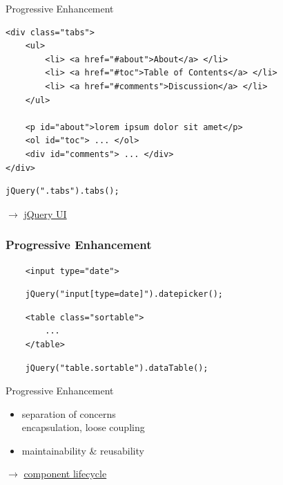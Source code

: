 \documentclass{beamer}
\begin{document}
\begin{frame}[fragile]{Progressive Enhancement}

  \begin{verbatim}
<div class="tabs">
    <ul>
        <li> <a href="#about">About</a> </li>
        <li> <a href="#toc">Table of Contents</a> </li>
        <li> <a href="#comments">Discussion</a> </li>
    </ul>

    <p id="about">lorem ipsum dolor sit amet</p>
    <ol id="toc"> ... </ol>
    <div id="comments"> ... </div>
</div>
  \end{verbatim}
  \begin{verbatim}
jQuery(".tabs").tabs();
  \end{verbatim}

  \tiny \ensuremath{\rightarrow} \href{http://jqueryui.com/tabs/}{jQuery UI}
\end{frame}

\begin{frame}[fragile]
  \frametitle{Progressive Enhancement}

  \begin{verbatim}
    <input type="date">
  \end{verbatim}
  \begin{verbatim}
    jQuery("input[type=date]").datepicker();
  \end{verbatim}

  \vspace*{0.5cm}
  \begin{verbatim}
    <table class="sortable">
        ...
    </table>
  \end{verbatim}
  \begin{verbatim}
    jQuery("table.sortable").dataTable();
  \end{verbatim}
\end{frame}

\begin{frame}{Progressive Enhancement}
  \begin{itemize}
    \item separation of concerns \\ encapsulation, loose coupling
    \item maintainability \& reusability
  \end{itemize}

  \vspace*{0.5cm}
  \ensuremath{\rightarrow}
  \href{http://helloworld.innoq.com/workshops/javascript/part4.html\#slide-40}{component lifecycle}
\end{frame}
\end{document}

